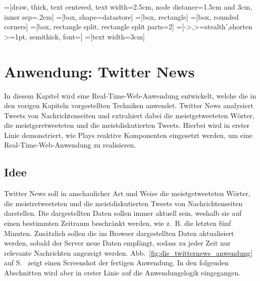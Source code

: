 
\makeatletter
{}
\makeatother

=[draw, thick, text centered, text width=2.5cm, node distance=1.5cm and 3cm, inner sep=.2cm]
=[box, shape=datastore]
=[box, rectangle]
=[box, rounded corners]
=[box, rectangle split, rectangle split parts=2]
=[->,>=stealth',shorten >=1pt, semithick, font=\footnotesize]
=[text width=3cm]

\chapter{Anwendung: Twitter News} %
\label{cha:anwendung}

In diesem Kapitel wird eine Real-Time-Web-Anwendung entwickelt, welche die in den vorigen Kapiteln vorgestellten Techniken anwendet.
Twitter News analysiert Tweets von Nachrichtenseiten und extrahiert dabei die meistgetweeteten Wörter, die meistgeretweeteten und die meistdiskutierten Tweets.
Hierbei wird in erster Linie demonstriert, wie Plays reaktive Komponenten eingesetzt werden, um eine Real-Time-Web-Anwendung zu realisieren.

\section{Idee} %
\label{sec:idee}

Twitter News soll in anschaulicher Art und Weise die meistgetweeteten Wörter, die meistretweeteten und die meistdiskutierten Tweets von Nachrichtenseiten darstellen.
Die dargestellten Daten sollen immer aktuell sein, weshalb sie auf einen bestimmten Zeitraum beschränkt werden, wie z.~B. die letzten fünf Minuten.
Zusätzlich sollen die im Browser dargestellten Daten aktualisiert werden, sobald der Server neue Daten empfängt, sodass zu jeder Zeit nur relevante Nachrichten angezeigt werden.
Abb.~\ref{fig:die_twitternews_anwendung} auf S.~\pageref{fig:die_twitternews_anwendung} zeigt einen Screenshot der fertigen Anwendung.
In den folgenden Abschnitten wird aber in erster Linie auf die Anwendungslogik eingegangen.

